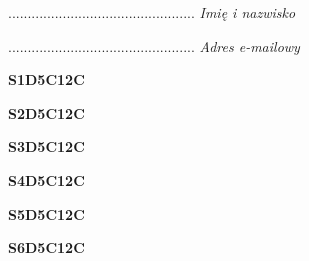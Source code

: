 \begin{turn}{90}\begin{minipage}{\linewidth} \vspace{20mm} ................................................  \textit{Imię i nazwisko}\end{minipage}\end{turn}

\begin{turn}{90}\begin{minipage}{\linewidth} \vspace{20mm} ................................................  \textit{Adres e-mailowy}\end{minipage}\end{turn}

\begin{turn}{90}\huge \begin{minipage}{\linewidth} \vspace{10mm}\textbf{S1D5C12C}\end{minipage}\end{turn}

\begin{turn}{90}\huge \begin{minipage}{\linewidth} \vspace{10mm}\textbf{S2D5C12C}\end{minipage}\end{turn}

\begin{turn}{90}\huge \begin{minipage}{\linewidth} \vspace{10mm}\textbf{S3D5C12C}\end{minipage}\end{turn}

\begin{turn}{90}\huge \begin{minipage}{\linewidth} \vspace{10mm}\textbf{S4D5C12C}\end{minipage}\end{turn}

\begin{turn}{90}\huge \begin{minipage}{\linewidth} \vspace{10mm}\textbf{S5D5C12C}\end{minipage}\end{turn}

\begin{turn}{90}\huge \begin{minipage}{\linewidth} \vspace{10mm}\textbf{S6D5C12C}\end{minipage}\end{turn}

